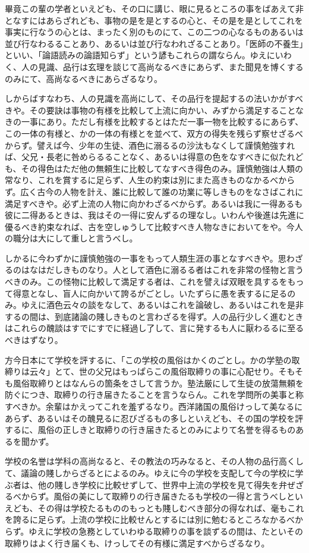 \documentclass[a4paper, platex, dvipdfmx]{jsarticle}
\begin{document}
畢竟この輩の学者といえども、その口に講じ、眼に見るところの事をばあえて非となすにはあらざれども、事物の是を是とするの心と、その是を是としてこれを事実に行なうの心とは、まったく別のものにて、この二つの心なるものあるいは並び行なわるることあり、あるいは並び行なわれざることあり。「医師の不養生」といい、「論語読みの論語知らず」という諺もこれらの謂ならん。ゆえにいわく、人の見識、品行は玄理を談じて高尚なるべきにあらず、また聞見を博くするのみにて、高尚なるべきにあらざるなり。

しからばすなわち、人の見識を高尚にして、その品行を提起するの法いかがすべきや。その要訣は事物の有様を比較して上流に向かい、みずから満足することなきの一事にあり。ただし有様を比較するとはただ一事一物を比較するにあらず、この一体の有様と、かの一体の有様とを並べて、双方の得失を残らず察せざるべからず。譬えば今、少年の生徒、酒色に溺るるの沙汰もなくして謹慎勉強すれば、父兄・長老に咎めらるることなく、あるいは得意の色をなすべきに似たれども、その得色はただ他の無頼生に比較してなすべき得色のみ。謹慎勉強は人類の常なり、これを賞するに足らず、人生の約束は別にまた高きものなかるべからず。広く古今の人物を計え、誰に比較して誰の功業に等しきものをなさばこれに満足すべきや。必ず上流の人物に向かわざるべからず。あるいは我に一得あるも彼に二得あるときは、我はその一得に安んずるの理なし。いわんや後進は先進に優るべき約束なれば、古を空しゅうして比較すべき人物なきにおいてをや。今人の職分は大にして重しと言うべし。

しかるに今わずかに謹慎勉強の一事をもって人類生涯の事となすべきや。思わざるのはなはだしきものなり。人として酒色に溺るる者はこれを非常の怪物と言うべきのみ。この怪物に比較して満足する者は、これを譬えば双眼を具するをもって得意となし、盲人に向かいて誇るがごとし。いたずらに愚を表するに足るのみ。ゆえに酒色云々の談をなして、あるいはこれを論破し、あるいはこれを是非するの間は、到底諸論の賤しきものと言わざるを得ず。人の品行少しく進むときはこれらの醜談はすでにすでに経過し了して、言に発するも人に厭わるるに至るべきはずなり。

方今日本にて学校を評するに、「この学校の風俗はかくのごとし。かの学塾の取締りは云々」とて、世の父兄はもっぱらこの風俗取締りの事に心配せり。そもそも風俗取締りとはなんらの箇条をさして言うか。塾法厳にして生徒の放蕩無頼を防ぐにつき、取締りの行き届きたることを言うならん。これを学問所の美事と称すべきか。余輩はかえってこれを羞ずるなり。西洋諸国の風俗けっして美なるにあらず、あるいはその醜見るに忍びざるもの多しといえども、その国の学校を評するに、風俗の正しきと取締りの行き届きたるとのみによりて名誉を得るものあるを聞かず。

学校の名誉は学科の高尚なると、その教法の巧みなると、その人物の品行高くして、議論の賤しからざるとによるのみ。ゆえに今の学校を支配して今の学校に学ぶ者は、他の賤しき学校に比較せずして、世界中上流の学校を見て得失を弁ぜざるべからず。風俗の美にして取締りの行き届きたるも学校の一得と言うべしといえども、その得は学校たるもののもっとも賤しむべき部分の得なれば、毫もこれを誇るに足らず。上流の学校に比較せんとするには別に勉むるところなかるべからず。ゆえに学校の急務としていわゆる取締りの事を談ずるの間は、たといその取締りはよく行き届くも、けっしてその有様に満足すべからざるなり。
\end{document}
